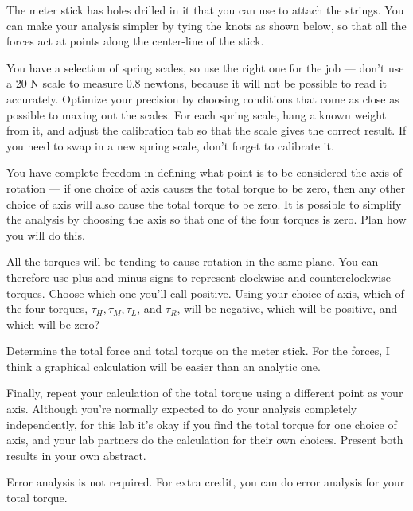 The meter stick has holes drilled in it that you can use to
attach the strings. You can make your analysis simpler by
tying the knots as shown below, so that all the forces act
at points along the center-line of the stick.


You have a selection of spring scales, so use the
right one for the job --- don't use a 20 N scale to
measure 0.8 newtons, because it will not be possible to read it accurately.
Optimize your precision by choosing conditions that come as close as possible
to maxing out the scales.
For each spring scale, hang a known weight from it, and adjust the
calibration tab so that the scale gives the correct result.
If you need to swap in a new spring scale, don't forget to calibrate it.

\prelab

\prelabquestion  You have complete freedom in defining what point is to be considered the axis of
rotation ---  if one choice of axis causes the total torque
to be zero, then any other choice of axis will also cause
the total torque to be zero.  It is possible to simplify the
analysis by choosing the axis so that one of the four
torques is zero.  Plan how you will do this.

\prelabquestion  All the torques will be tending to cause rotation in the
same plane.  You can therefore use plus and minus signs to
represent clockwise and counterclockwise torques.  Choose
which one you'll call positive.  Using your choice of axis,
which of the four torques, $\tau_H,\tau_M,\tau_L$, and
$\tau_R$, will be negative, which will be positive,
and which will be zero?

\analysis

Determine the total force and total torque on the meter
stick.  For the forces, I think a graphical calculation will
be easier than an analytic one.

Finally, repeat your calculation of the total torque using a
different point as your axis. Although you're normally expected to
do your analysis completely independently, for this lab it's okay
if you find the total torque for one choice of axis, and your lab
partners do the calculation for their own choices. Present both
results in your own abstract.

Error analysis is not required. For extra credit, you can do
error analysis for your total torque.
